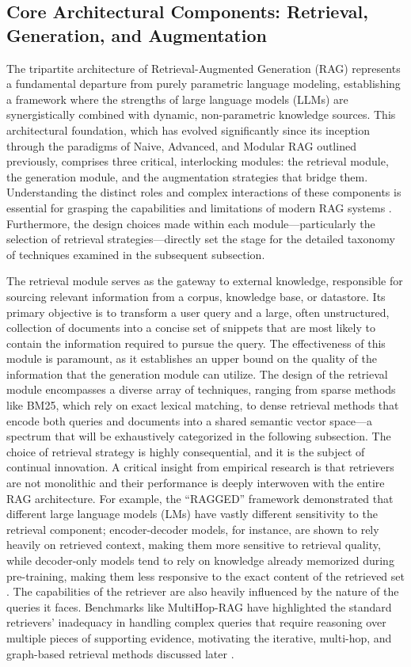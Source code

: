 \documentclass[11pt]{article}
\begin{document}
\subsection{Core Architectural Components: Retrieval, Generation, and Augmentation}

The tripartite architecture of Retrieval-Augmented Generation (RAG) represents a fundamental departure from purely parametric language modeling, establishing a framework where the strengths of large language models (LLMs) are synergistically combined with dynamic, non-parametric knowledge sources. This architectural foundation, which has evolved significantly since its inception through the paradigms of Naive, Advanced, and Modular RAG outlined previously, comprises three critical, interlocking modules: the retrieval module, the generation module, and the augmentation strategies that bridge them. Understanding the distinct roles and complex interactions of these components is essential for grasping the capabilities and limitations of modern RAG systems \cite{ref1,ref2}. Furthermore, the design choices made within each module---particularly the selection of retrieval strategies---directly set the stage for the detailed taxonomy of techniques examined in the subsequent subsection.

The retrieval module serves as the gateway to external knowledge, responsible for sourcing relevant information from a corpus, knowledge base, or datastore. Its primary objective is to transform a user query and a large, often unstructured, collection of documents into a concise set of snippets that are most likely to contain the information required to pursue the query. The effectiveness of this module is paramount, as it establishes an upper bound on the quality of the information that the generation module can utilize. The design of the retrieval module encompasses a diverse array of techniques, ranging from sparse methods like BM25, which rely on exact lexical matching, to dense retrieval methods that encode both queries and documents into a shared semantic vector space---a spectrum that will be exhaustively categorized in the following subsection. The choice of retrieval strategy is highly consequential, and it is the subject of continual innovation. A critical insight from empirical research is that retrievers are not monolithic and their performance is deeply interwoven with the entire RAG architecture. For example, the ``RAGGED'' framework demonstrated that different large language models (LMs) have vastly different sensitivity to the retrieval component; encoder-decoder models, for instance, are shown to rely heavily on retrieved context, making them more sensitive to retrieval quality, while decoder-only models tend to rely on knowledge already memorized during pre-training, making them less responsive to the exact content of the retrieved set \cite{ref7}. The capabilities of the retriever are also heavily influenced by the nature of the queries it faces. Benchmarks like MultiHop-RAG have highlighted the standard retrievers' inadequacy in handling complex queries that require reasoning over multiple pieces of supporting evidence, motivating the iterative, multi-hop, and graph-based retrieval methods discussed later \cite{ref8}.
\end{document}
